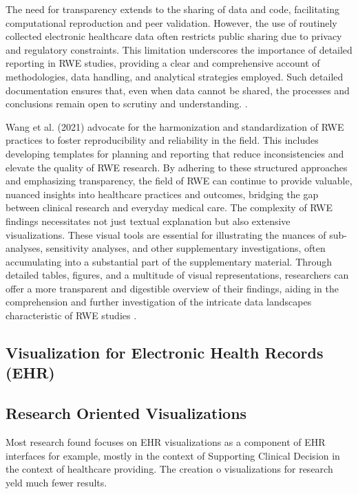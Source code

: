 The need for transparency extends to the sharing of data and code, facilitating computational reproduction and peer validation. However, the use of routinely collected electronic healthcare data often restricts public sharing due to privacy and regulatory constraints. This limitation underscores the importance of detailed reporting in RWE studies, providing a clear and comprehensive account of methodologies, data handling, and analytical strategies employed. Such detailed documentation ensures that, even when data cannot be shared, the processes and conclusions remain open to scrutiny and understanding. \cite{soa5}\cite{soa6}.

Wang et al. (2021) advocate for the harmonization and standardization of RWE practices to foster reproducibility and reliability in the field. This includes developing templates for planning and reporting that reduce inconsistencies and elevate the quality of RWE research. By adhering to these structured approaches and emphasizing transparency, the field of RWE can continue to provide valuable, nuanced insights into healthcare practices and outcomes, bridging the gap between clinical research and everyday medical care. The complexity of RWE findings necessitates not just textual explanation but also extensive visualizations. These visual tools are essential for illustrating the nuances of sub-analyses, sensitivity analyses, and other supplementary investigations, often accumulating into a substantial part of the supplementary material. Through detailed tables, figures, and a multitude of visual representations, researchers can offer a more transparent and digestible overview of their findings, aiding in the comprehension and further investigation of the intricate data landscapes characteristic of RWE studies \cite{soa5}.

\subsection{Visualization for Electronic Health Records (EHR)}\label{visualization-for-electronic-health-records-ehr}

\subsection{Research Oriented Visualizations}\label{research-oriented-visualizations}


Most research found focuses on EHR visualizations as a component of EHR interfaces for example, mostly in the context of Supporting Clinical Decision in the context of healthcare providing. The creation o visualizations for research yeld much fewer results.


